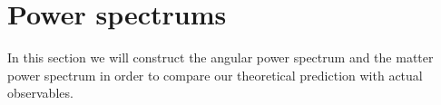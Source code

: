 \section{Power spectrums}\label{sec:m4}

In this section we will construct the angular power spectrum and the matter power spectrum in order to compare our theoretical prediction with actual observables.




